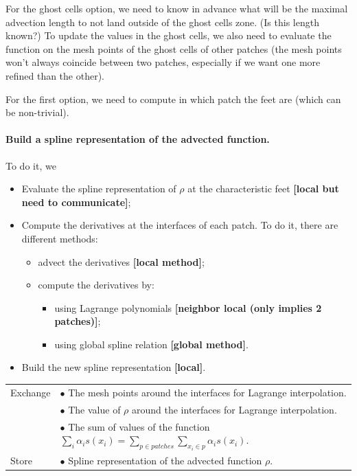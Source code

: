 \documentclass[presentation.tex]{subfiles}
\begin{document}
For the ghost cells option, we need to know in advance what will be the maximal advection length to not land outside of the ghost cells zone. (Is this length known?) To update the values in the ghost cells, we also need to evaluate the function on the mesh points of the ghost cells of other patches (the mesh points won't always coincide between two patches, especially if we want one more refined than the other). 

For the first option, we need to compute in which patch the feet are (which can be non-trivial).



\paragraph{Build a spline representation of the advected function.}
To do it, we 
\begin{itemize}
	\item Evaluate the spline representation of $\rho$ at the characteristic feet \textbf{[local but need to communicate]}; 
	\item Compute the derivatives at the interfaces of each patch. To do it, there are different methods: 
	\begin{itemize}
		\item advect the derivatives \textbf{[local method]}; 
		\item compute the derivatives by: 
		\begin{itemize}
			\item using Lagrange polynomials \textbf{[neighbor local (only implies 2 patches)]}; 
			\item using global spline relation \textbf{[global method]}. 
		\end{itemize}
	\end{itemize}
	\item Build the new spline representation \textbf{[local]}.
\end{itemize}


\begin{center}
\begin{tabular}{ |l|l| } 
 \hline
 Exchange 	&  $\bullet$ The mesh points around the interfaces for Lagrange interpolation. \\
 			&  $\bullet$ The value of $\rho$ around the interfaces for Lagrange interpolation. \\
 		 	&  $\bullet$ The sum of values of the function $\sum_i \alpha_i s(x_i) = \sum_{p \in patches}\sum_{x_i\in p} \alpha_i s(x_i)$. \\
 \hline
 Store 	& $\bullet$ Spline representation of the advected function $\rho$. \\
 \hline
\end{tabular}
\end{center}
\end{document}
